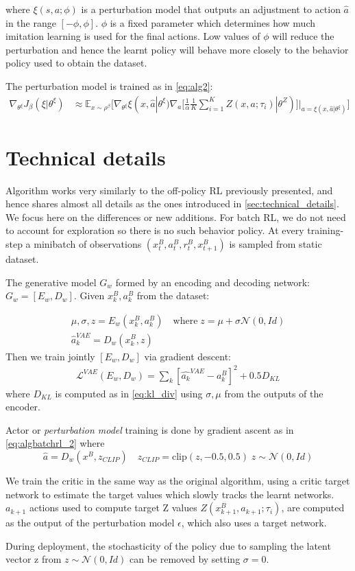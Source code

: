 where  $\xi(s,a;\phi)$ is a perturbation model that outputs an adjustment to action $\hat{a}$
in the range $[-\phi,\phi]$. $\phi$ is a fixed parameter which determines how much imitation learning
is used for the final actions. Low values of $\phi$ will reduce the perturbation and hence the 
learnt policy will behave more closely to the behavior policy used to obtain the dataset.

The perturbation model is trained as in \ref{eq:alg2}:
\begin{align}
    \nabla_{\theta^\xi} J_\beta(\xi | \theta^\xi) &\approx \mathbb E_{x \sim \rho^\beta} 
\big [\nabla_{\theta^\xi} \xi(x,\hat{a}| \theta^\xi) \nabla_a  [\frac{1}{\alpha} \frac{1}{K}
\sum_{i=1}^K Z(x,a; \tau_i) | \theta^Z)]|_{a=\xi(x,\hat{a}| \theta^\xi)}  \big] \label{eq:algbatchrl_2}
\end{align}

\section{Technical details}
Algorithm works very similarly to the off-policy RL previously presented, and hence shares almost all details
as the ones introduced in \ref{sec:technical_details}.
We focus here on the differences or new additions.
For batch RL, we do not need to account for exploration so there is no such behavior policy.
At every training-step a minibatch of observations  $(x_t^B,a_t^B,r_t^B,x_{t+1}^B)$ is sampled from
static dataset.

The generative model $G_w$ formed by an encoding and decoding
network: $G_w=[E_w,D_w]$. Given $x_{k}^B,a_{k}^B$ from the dataset:

\begin{align}
    \mu, \sigma, z = E_w(x_{k}^B,a_{k}^B) \quad \text{where} \; z=\mu + \sigma \mathcal{N}(0,Id)\\
    \hat{a}_k^{VAE} = D_w(x_{k}^B, z)
\end{align}
Then we train jointly $[E_w,D_w]$ via gradient descent:
\begin{align}
    \mathcal{L}^{VAE}(E_w,D_w)= \sum_k[\hat{a_k}^{VAE}-a_{k}^B]^2 + 0.5 D_{KL}
\end{align}
where $D_{KL}$ is computed as in \ref{eq:kl_div} using $\sigma,\mu$ from the outputs of the encoder.

Actor or \textit{perturbation model} training is done by gradient ascent as in \ref{eq:algbatchrl_2}
where 
\begin{equation}
    \hat{a} = D_w(x^B, z_{CLIP}) \quad z_{CLIP} = \text{clip}(z, -0.5,0.5) \;z \sim \mathcal{N}(0,Id)
\end{equation}

We train the critic in the same way as the original algorithm,
using a critic target network to estimate the target values 
which slowly tracks the learnt networks.
$a_{k+1}$ actions used to compute target Z values $Z(x_{k+1}^B,a_{k+1}; \tau_i)$,
are computed as the output of the perturbation model $\epsilon$, which also uses a target network.

During deployment, the stochasticity of the policy due to sampling the latent vector z from 
$z \sim \mathcal{N}(0,Id)$ can be removed by setting $\sigma=0$.

